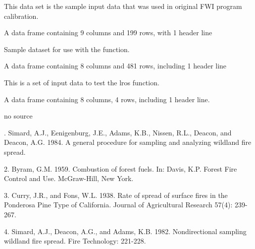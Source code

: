 \documentclass[a4paper]{book}
\begin{document}
%
\begin{Description}\relax
This data set is the sample input data that was used in original FWI program
calibration.
\end{Description}
%
\begin{Format}
A data frame containing 9 columns and 199 rows, with 1 header line
\end{Format}
%
\begin{Description}\relax
Sample dataset for use with the  function.
\end{Description}
%
\begin{Format}
A data frame containing 8 columns and 481 rows, including 1 header
line
\end{Format}
%
\begin{Description}\relax
This is a set of input data to test the lros function.
\end{Description}
%
\begin{Format}
A data frame containing 8 columns, 4 rows, including 1 header line.
\end{Format}
%
\begin{Source}\relax
no source
\end{Source}
%
\begin{References}. Simard, A.J., Eenigenburg, J.E., Adams, K.B., Nissen, R.L.,
Deacon, and Deacon, A.G. 1984. A general procedure for sampling and
analyzing wildland fire spread.

2. Byram, G.M. 1959. Combustion of forest fuels. In: Davis, K.P. Forest Fire
Control and Use. McGraw-Hill, New York.

3. Curry, J.R., and Fons, W.L. 1938. Rate of spread of surface fires in the
Ponderosa Pine Type of California. Journal of Agricultural Research 57(4):
239-267.

4. Simard, A.J., Deacon, A.G., and Adams, K.B. 1982. Nondirectional sampling
wildland fire spread. Fire Technology: 221-228.
\end{References}
\end{document}
